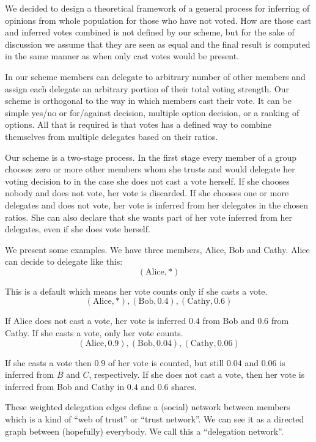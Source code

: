 \documentclass[a4paper]{acm_proc_article-sp}
\begin{document}
We decided to design a theoretical framework of a general process for inferring of opinions from whole population for
those who have not voted. How are those cast and inferred votes combined is not defined by our scheme, but for the
sake of discussion we assume that they are seen as equal and the final result is computed in the same manner as when
only cast votes would be present.

In our scheme members can delegate to arbitrary number of other members and assign each delegate an arbitrary portion
of their total voting strength. Our scheme is orthogonal to the way in which members cast their vote. It can be simple
yes/no or for/against decision, multiple option decision, or a ranking of options. All that is required is that votes has a
defined way to combine themselves from multiple delegates based on their ratios.

Our scheme is a two-stage process. In the first stage every member of a group chooses zero or more other members whom she
trusts and would delegate her voting decision to in the case she does not cast a vote herself. If she chooses nobody and
does not vote, her vote is discarded. If she chooses one or more delegates and does not vote, her vote is inferred from
her delegates in the chosen ratios. She can also declare that she wants part of her vote inferred from her delegates,
even if she does vote herself.

We present some examples. We have three members, Alice, Bob and Cathy. Alice can decide to delegate like this:
$$(\mathrm{Alice}, *)$$

This is a default which means her vote counts only if she casts a vote.
$$(\mathrm{Alice}, *), (\mathrm{Bob}, 0.4), (\mathrm{Cathy}, 0.6)$$

If Alice does not cast a vote, her vote is inferred $0.4$ from Bob and $0.6$ from Cathy. If she casts a vote, only her
vote counts.
$$(\mathrm{Alice}, 0.9), (\mathrm{Bob}, 0.04), (\mathrm{Cathy}, 0.06)$$

If she casts a vote then $0.9$ of her vote is counted, but still $0.04$ and $0.06$ is inferred from $B$ and $C$, respectively.
If she does not cast a vote, then her vote is inferred from Bob and Cathy in $0.4$ and $0.6$ shares.

These weighted delegation edges define a (social) network between members which is a kind of ``web of trust'' or
``trust network''. We can see it as a directed graph between (hopefully) everybody. We call this a ``delegation network''.
\end{document}
